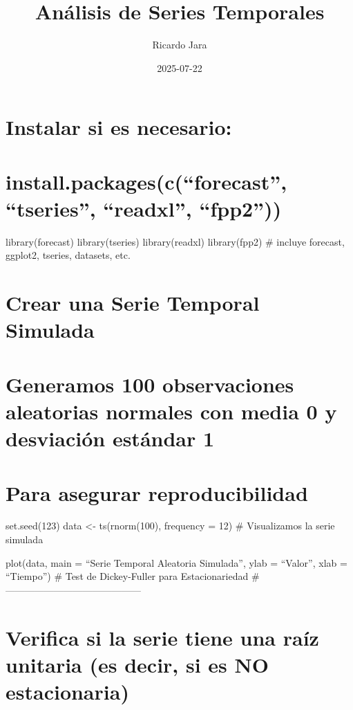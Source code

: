 \documentclass[
]{article}
\title{Análisis de Series Temporales}
\author{Ricardo Jara}
\date{2025-07-22}
\begin{document}
\maketitle

\section{Instalar si es necesario:}\label{instalar-si-es-necesario}

\section{install.packages(c(``forecast'', ``tseries'', ``readxl'',
``fpp2''))}\label{install.packagescforecast-tseries-readxl-fpp2}

library(forecast) library(tseries) library(readxl) library(fpp2) \#
incluye forecast, ggplot2, tseries, datasets, etc.

\section{Crear una Serie Temporal
Simulada}\label{crear-una-serie-temporal-simulada}

\section{Generamos 100 observaciones aleatorias normales con media 0 y
desviación estándar
1}\label{generamos-100-observaciones-aleatorias-normales-con-media-0-y-desviaciuxf3n-estuxe1ndar-1}

\section{Para asegurar
reproducibilidad}\label{para-asegurar-reproducibilidad}

set.seed(123) data \textless- ts(rnorm(100), frequency = 12) \#
Visualizamos la serie simulada

plot(data, main = ``Serie Temporal Aleatoria Simulada'', ylab =
``Valor'', xlab = ``Tiempo'') \# Test de Dickey-Fuller para
Estacionariedad \# ------------------------------------------

\section{Verifica si la serie tiene una raíz unitaria (es decir, si es
NO
estacionaria)}\label{verifica-si-la-serie-tiene-una-rauxedz-unitaria-es-decir-si-es-no-estacionaria}
\end{document}
